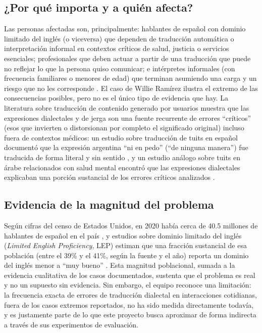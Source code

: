 \documentclass[11pt,a4paper]{article}
\begin{document}
\subsection{¿Por qué importa y a quién afecta?}

Las personas afectadas son, principalmente: hablantes de español con dominio limitado del inglés (o viceversa) que dependen de traducción automática o interpretación informal en contextos críticos de salud, justicia o servicios esenciales; profesionales que deben actuar a partir de una traducción que puede no reflejar lo que la persona quiso comunicar; e intérpretes informales (con frecuencia familiares o menores de edad) que terminan asumiendo una carga y un riesgo que no les corresponde \cite{amsresources2026}. El caso de Willie Ramírez \cite{ramirez2008} ilustra el extremo de las consecuencias posibles, pero no es el único tipo de evidencia que hay. La literatura sobre traducción de contenido generado por usuarios muestra que las expresiones dialectales y de jerga son una fuente recurrente de errores ``críticos'' (esos que invierten o distorsionan por completo el significado original) incluso fuera de contextos médicos: un estudio sobre traducción de tuits en español documentó que la expresión argentina ``ni en pedo'' (``de ninguna manera'') fue traducida de forma literal y sin sentido \cite{twitteremotion}, y un estudio análogo sobre tuits en árabe relacionados con salud mental encontró que las expresiones dialectales explicaban una porción sustancial de los errores críticos analizados \cite{zbib-cited-via-arabic}.

\subsection{Evidencia de la magnitud del problema}

Según cifras del censo de Estados Unidos, en 2020 había cerca de 40.5 millones de hablantes de español en el país \cite{census2022}, y estudios sobre dominio limitado del inglés (\textit{Limited English Proficiency}, LEP) estiman que una fracción sustancial de esa población (entre el 39\% y el 41\%, según la fuente y el año) reporta un dominio del inglés menor a ``muy bueno'' \cite{migrationpolicy2023}. Esta magnitud poblacional, sumada a la evidencia cualitativa de los casos documentados, sustenta que el problema es real y no un supuesto sin evidencia. Sin embargo, el equipo reconoce una limitación: la frecuencia exacta de errores de traducción dialectal en interacciones cotidianas, fuera de los casos extremos reportados, no ha sido medida directamente todavía, y es justamente parte de lo que este proyecto busca aproximar de forma indirecta a través de sus experimentos de evaluación.
\end{document}
